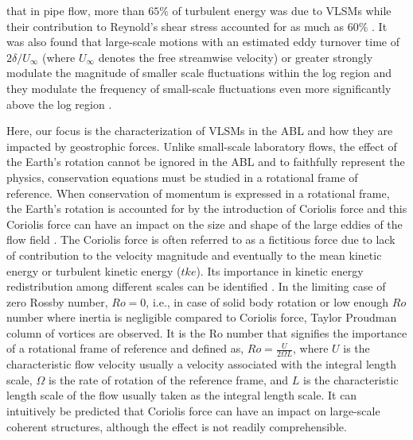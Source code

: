 that in pipe flow,  more than $65\%$ of turbulent energy was due to VLSMs while their contribution to Reynold's shear stress accounted for as much as $60\%$ \cite{guala_adrian_jfm2006}. It was also found that large-scale motions with an estimated eddy turnover time of $2\delta/U_{\infty}$ (where $U_{\infty}$ denotes the free streamwise velocity) or greater strongly modulate the magnitude of smaller scale fluctuations within the log region and they modulate the frequency of small-scale fluctuations even more significantly above the log region \cite{ganapathi_jfm_2012_modulation}. 


Here, our focus is the characterization of VLSMs in the ABL and how they are impacted by  geostrophic forces. Unlike small-scale laboratory flows, the effect of the Earth's rotation cannot be ignored in the ABL and to faithfully represent the physics, conservation equations must be studied in a rotational frame of reference.  When conservation of momentum is expressed in a rotational frame, the Earth's rotation is accounted for by the introduction of Coriolis force and this Coriolis force can have an impact on the size and shape of the large eddies of the flow field \cite{esau_jot_2002}. The Coriolis force is often referred to as a fictitious force due to lack of contribution to the velocity magnitude and eventually to the mean kinetic energy or turbulent kinetic energy ($tke$). Its importance in kinetic energy redistribution among different scales can be identified \citep{hossain_pof_94}. In the limiting case of zero Rossby number, $Ro=0$,  i.e., in case of solid body rotation or low enough $Ro$ number where inertia is negligible compared to Coriolis force, Taylor Proudman column of vortices are observed. It is the Ro number that signifies the  importance of a rotational frame of reference and defined as,  $Ro=\frac{U}{2\Omega L}$, where $U$ is the characteristic flow velocity usually a velocity associated with the integral length scale, $\Omega$ is the rate of rotation of the reference frame, and $L$ is the characteristic length scale of the flow usually taken as the integral length scale. It can  intuitively be predicted that Coriolis force  can have an impact on large-scale coherent structures, although the effect is not readily comprehensible.   

 

